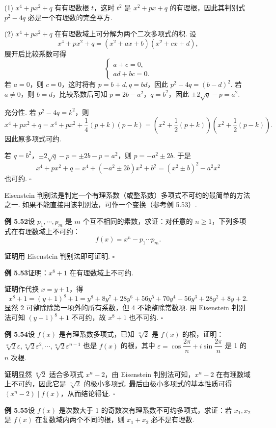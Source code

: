 \documentclass[UTF8,12pt,a4paper,fontset=fandol]{ctexart}
\begin{document}
(1) $x^4+px^2+q$ 有有理数根 $t$，这时 $t^2$ 是 $x^2+px+q$ 的有理根，因此其判别式 $p^2-4q$ 必是一个有理数的完全平方.

(2) $x^4+px^2+q$ 在有理数域上可分解为两个二次多项式的积. 设
\[
x^4+px^2+q=(x^2+ax+b)(x^2+cx+d),
\]
展开后比较系数可得
\[
\left\{
\begin{array}{l}
a+c=0,\\
ad+bc=0.
\end{array}
\right.
\]
若 $a=0$，则 $c=0$，这时将有 $p=b+d,q=bd$，因此 $p^2-4q=(b-d)^2$. 若 $a\ne0$，则 $b=d$，比较系数后可知 $p=2b-a^2$，$q=b^2$，因此 $\pm2\sqrt q-p=a^2$.

充分性. 若 $p^2-4q=k^2$，则
\[
x^4+px^2+q=x^4+px^2+\frac14(p+k)(p-k)
=\left(x^2+\frac12(p+k)\right)\left(x^2+\frac12(p-k)\right).
\]
因此原多项式可约.

若 $q=b^2$，$\pm2\sqrt q-p=\pm2b-p=a^2$，则 $p=-a^2\pm2b$. 于是
\[
x^4+px^2+q=x^4+(-a^2\pm2b)x^2+b^2=(x^2\pm b)^2-a^2x^2
\]
也可约. \hfill $\square$

Eisenstein 判别法是判定一个有理系数（或整系数）多项式不可约的最简单的方法之一. 如果不能直接用该判别法，可作一个变换（参考例 5.53）.

\noindent\textbf{例 5.52}\quad 设 $p_1,\cdots,p_m$ 是 $m$ 个互不相同的素数，求证：对任意的 $n\ge1$，下列多项式在有理数域上不可约：
\[
f(x)=x^n-p_1\cdots p_m.
\]

\noindent\textbf{证明}\quad 用 Eisenstein 判别法即可证明. \hfill $\square$

\noindent\textbf{例 5.53}\quad 证明：$x^8+1$ 在有理数域上不可约.

\noindent\textbf{证明}\quad 作代换 $x=y+1$，得
\[
x^8+1=(y+1)^8+1=y^8+8y^7+28y^6+56y^5+70y^4+56y^3+28y^2+8y+2.
\]
显然 2 可整除除第一项外的所有系数，但 4 不能整除常数项. 用 Eisenstein 判别法可知 $(y+1)^8+1$ 不可约，故 $x^8+1$ 也不可约. \hfill $\square$

\noindent\textbf{例 5.54}\quad 设 $f(x)$ 是有理系数多项式，已知 $\sqrt[n]{2}$ 是 $f(x)$ 的根，证明：$\sqrt[n]{2}\varepsilon,\sqrt[n]{2}\varepsilon^2,\cdots,\sqrt[n]{2}\varepsilon^{n-1}$ 也是 $f(x)$ 的根，其中 $\varepsilon=\cos\dfrac{2\pi}{n}+i\sin\dfrac{2\pi}{n}$ 是 1 的 $n$ 次根.

\noindent\textbf{证明}\quad 显然 $\sqrt[n]{2}$ 适合多项式 $x^n-2$，由 Eisenstein 判别法可知，$x^n-2$ 在有理数域上不可约，因此它是 $\sqrt[n]{2}$ 的极小多项式. 最后由极小多项式的基本性质可得 $(x^n-2)\mid f(x)$，从而结论得证. \hfill $\square$

\noindent\textbf{例 5.55}\quad 设 $f(x)$ 是次数大于 1 的奇数次有理系数不可约多项式，求证：若 $x_1,x_2$ 是 $f(x)$ 在复数域内两个不同的根，则 $x_1+x_2$ 必不是有理数.
\end{document}
